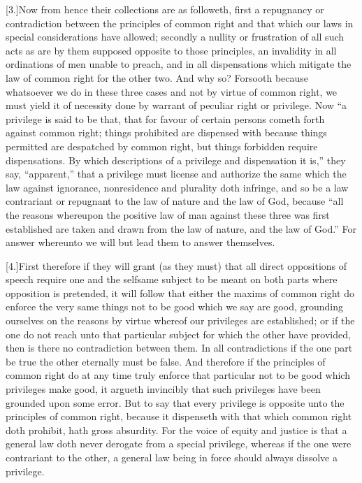 [3.]Now from hence their collections are as followeth, first a repugnancy or contradiction between the principles of common right and that which our laws in special considerations have allowed; secondly a nullity or frustration of all such acts as are by them supposed opposite to those principles, an invalidity in all ordinations of men unable to preach, and in all dispensations which mitigate the law of common right for the other two. And why so? Forsooth because whatsoever we do in these three cases and not by virtue of common right, we must yield it of necessity done by warrant of peculiar right or privilege. Now “a privilege is said to be that, that for favour of certain persons cometh forth against common right; things prohibited are dispensed with because things permitted are despatched by common right, but things forbidden require dispensations. By which descriptions of a privilege and dispensation it is,” they say, “apparent,”  that a privilege must license and authorize the same which the law against ignorance,
 nonresidence and plurality doth infringe, and so be a law contrariant or repugnant to the law of nature and the law of God, because “all the reasons whereupon the positive law of man against these three was first established are taken and drawn from the law of nature, and the law of God.” For answer whereunto we will but lead them to answer themselves.

[4.]First therefore if they will grant (as they must) that all direct oppositions of speech require one and the selfsame subject to be meant on both parts where opposition is pretended, it will follow that either the maxims of common right do enforce the very same things not to be good which we say are good, grounding ourselves on the reasons by virtue whereof our privileges are established; or if the one do not reach unto that particular subject for which the other have provided, then is there no contradiction between them. In all contradictions if the one part be true the other eternally must be false. And therefore if the principles of common right do at any time truly enforce that particular not to be good which privileges make good, it argueth invincibly that such privileges have been grounded upon some error. But to say that every privilege is opposite unto the principles of common right, because it dispenseth with that which common right doth prohibit, hath gross absurdity. For the voice of equity and justice is that a general law doth never derogate from a special privilege, whereas if the one were contrariant to the other, a general law being in force should always dissolve a privilege.

